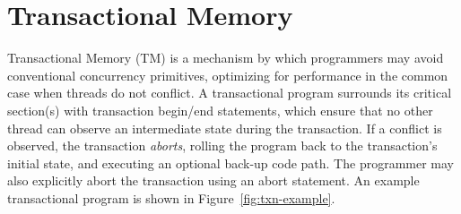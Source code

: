 \section{Transactional Memory}

Transactional Memory (TM) is a mechanism by which programmers may avoid conventional concurrency primitives, optimizing for performance in the common case when threads do not conflict.
A transactional program surrounds its critical section(s) with transaction begin/end statements, which ensure that no other thread can observe an intermediate state during the transaction.
If a conflict is observed, the transaction {\em aborts}, rolling the program back to the transaction's initial state, and executing an optional back-up code path.
The programmer may also explicitly abort the transaction using an abort statement.
An example transactional program is shown in Figure~\ref{fig:txn-example}.

